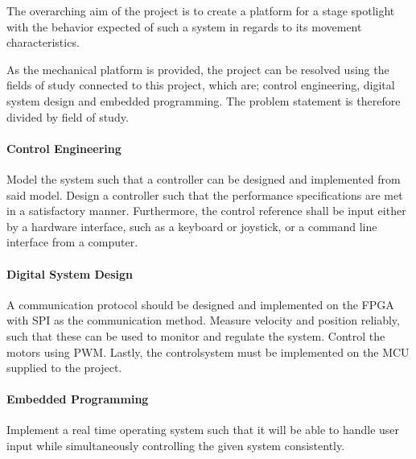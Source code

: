 \documentclass[../../main]{subfiles}
\begin{document}
The overarching aim of the project is to create a platform for a stage spotlight with the behavior expected of such a system in regards to its movement characteristics.

As the mechanical platform is provided, the project can be resolved using the fields of study connected to this project, which are; control engineering, digital system design and embedded programming.
The problem statement is therefore divided by field of study.




\paragraph{Control Engineering}%
\label{par:control_engineering}
Model the system such that a controller can be designed and implemented from said model.
Design a controller such that the performance specifications are met in a satisfactory manner.
Furthermore, the control reference shall be input either by a hardware interface, such as a keyboard or joystick, or a command line interface from a computer.

\paragraph{Digital System Design}%
\label{par:digital_system_design}
A communication protocol should be designed and implemented on the FPGA with SPI as the communication method.
Measure velocity and position reliably, such that these can be used to monitor and regulate the
system.
Control the motors using PWM. Lastly, the controlsystem must be implemented on the MCU supplied to the project.

\paragraph{Embedded Programming}%
\label{par:emebedded_programming}
Implement a real time operating system such that it will be able to handle user input while simultaneously controlling the given system consistently.
\\
\end{document}
